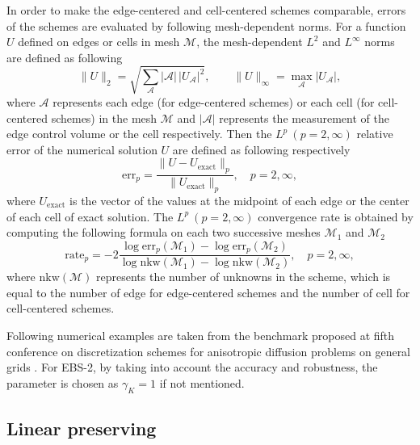 \documentclass[times,review,preprint,authoryear]{elsarticle}
\begin{document}
In order to make the edge-centered and cell-centered schemes comparable, errors of the schemes are evaluated by following mesh-dependent norms.
For a function $U$ defined on edges or cells in mesh $\mathcal{M}$, the mesh-dependent $L^2$ and $L^{\infty}$ norms are defined as following
\begin{equation}
\|U\|_{2} = \sqrt{ \sum_{\mathcal{A}} |\mathcal{A}| \, |U_{\mathcal{A}}|^2 }, \qquad \|U\|_{\infty} = \max_{\mathcal{A}} |U_{\mathcal{A}}|,
\end{equation}
where $\mathcal{A}$ represents each edge (for edge-centered schemes) or each cell (for cell-centered schemes) in the mesh $\mathcal{M}$ and $|\mathcal{A}|$ represents the measurement of the edge control volume or the cell respectively.
Then the $L^p \ (p = 2, \infty)$ relative error of the numerical solution $U$ are defined as following respectively
\begin{equation}
\text{err}_{p} = \frac{\|U - U_{\text{exact}}\|_{p}}{\|U_{\text{exact}}\|_{p}}, \quad p = 2, \infty,
\end{equation}
where $U_{\text{exact}}$ is the vector of the values at the midpoint of each edge or the center of each cell of exact solution.
The $L^p \ (p = 2, \infty)$ convergence rate is obtained by computing the following formula on each two successive meshes $\mathcal{M}_1$ and $\mathcal{M}_2$
\begin{equation}
\text{rate}_{p} = -2 \frac{\log \text{err}_{p}(\mathcal{M}_1) - \log \text{err}_{p}(\mathcal{M}_2)}{\log \text{nkw}(\mathcal{M}_1) - \log \text{nkw}(\mathcal{M}_2)}, \quad p = 2, \infty,
\end{equation}
where $\text{nkw}(\mathcal{M})$ represents the number of unknowns in the scheme, which is equal to the number of edge for edge-centered schemes and the number of cell for cell-centered schemes.

Following numerical examples are taken from the benchmark proposed at fifth conference on discretization schemes for anisotropic diffusion problems on general grids \cite{???}. For EBS-2, by taking into account the accuracy and robustness, the parameter is chosen as $\gamma_K = 1$ if not mentioned.

\subsection{Linear preserving}
\end{document}
